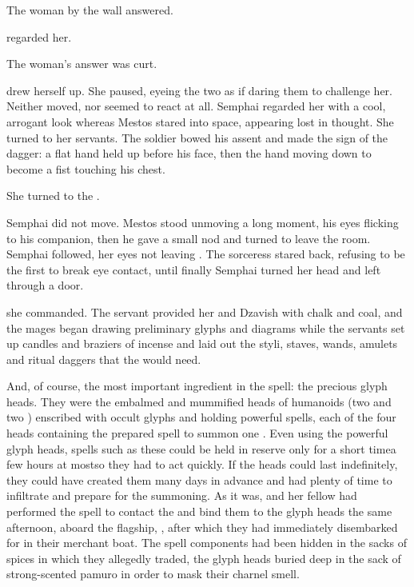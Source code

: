 The woman by the wall answered.  

\Filgzed{} regarded her. 

The woman's answer was curt. 

 \Filgzed{} drew herself up.  She paused, eyeing the two \Gisshorn{} as if daring them to challenge her. Neither moved, nor seemed to react at all. Semphai regarded her with a cool, arrogant look whereas Mestos stared into space, appearing lost in thought. She turned to her servants.  The soldier bowed his assent and made the sign of the dagger: a flat hand held up before his face, then the hand moving down to become a fist touching his chest.


She turned to the \Gisshorn{}.  

Semphai did not move. Mestos stood unmoving a long moment, his eyes flicking to his companion, then he gave a small nod and turned to leave the room. Semphai followed, her eyes not leaving \Filgzedz. The sorceress stared back, refusing to be the first to break eye contact, until finally Semphai turned her head and left through a door. 

 she commanded. The servant provided her and Dzavish with chalk and coal, and the mages began drawing preliminary glyphs and diagrams while the servants set up candles and braziers of incense and laid out the styli, staves, wands, amulets and ritual daggers that the \Sheshefkesad{} would need. 

And, of course, the most important ingredient in the spell: the precious glyph heads. They were the embalmed and mummified heads of humanoids (two \human{} and two \scathaese{}) enscribed with occult glyphs and holding powerful spells, each of the four heads containing the prepared spell to summon one \daemon. Even using the powerful glyph heads, spells such as these could be held in reserve only for a short time\dash{}a few hours at most\dash{}so they had to act quickly. If the heads could last indefinitely, they could have created them many days in advance and had plenty of time to infiltrate \Cicora{} and prepare for the summoning. As it was, \Filgzed{} and her fellow \Sheshefkesad{} had performed the spell to contact the \daemons{} and bind them to the glyph heads the same afternoon, aboard the flagship, , after which they had immediately disembarked for \FendorSmall{} in their merchant boat. The spell components had been hidden in the sacks of spices in which they allegedly traded, the glyph heads buried deep in the sack of strong-scented pamuro in order to mask their charnel smell.


